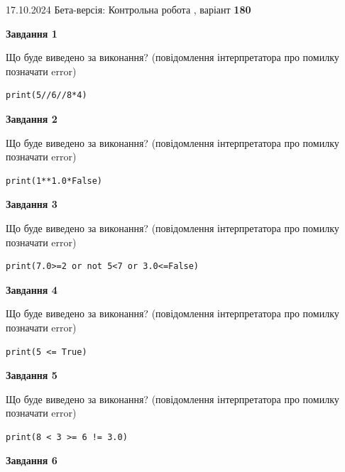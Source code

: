 \documentclass[12pt, ukrainian]{article}
\begin{document}
{\Large{17.10.2024 Бета-версія: Контрольна робота , варіант  \No \textbf { 180 }\par}}
{
\begin {large}
{\begin {center}\textbf{Завдання 1}\end {center}}

Що буде виведено за виконання? (повідомлення інтерпретатора про помилку позначати error)\par
\begin{verbatim}
print(5//6//8*4)
\end{verbatim}

{\begin {center}\textbf{Завдання 2}\end {center}}

Що буде виведено за виконання? (повідомлення інтерпретатора про помилку позначати error)\par
\begin{verbatim}
print(1**1.0*False)
\end{verbatim}

{\begin {center}\textbf{Завдання 3}\end {center}}

Що буде виведено за виконання? (повідомлення інтерпретатора про помилку позначати error)\par
\begin{verbatim}
print(7.0>=2 or not 5<7 or 3.0<=False)
\end{verbatim}

{\begin {center}\textbf{Завдання 4}\end {center}}

Що буде виведено за виконання? (повідомлення інтерпретатора про помилку позначати error)\par
\begin{verbatim}
print(5 <= True)
\end{verbatim}

{\begin {center}\textbf{Завдання 5}\end {center}}

Що буде виведено за виконання? (повідомлення інтерпретатора про помилку позначати error)\par
\begin{verbatim}
print(8 < 3 >= 6 != 3.0)
\end{verbatim}

{\begin {center}\textbf{Завдання 6}\end {center}}


\end{large}}
\end{document}

